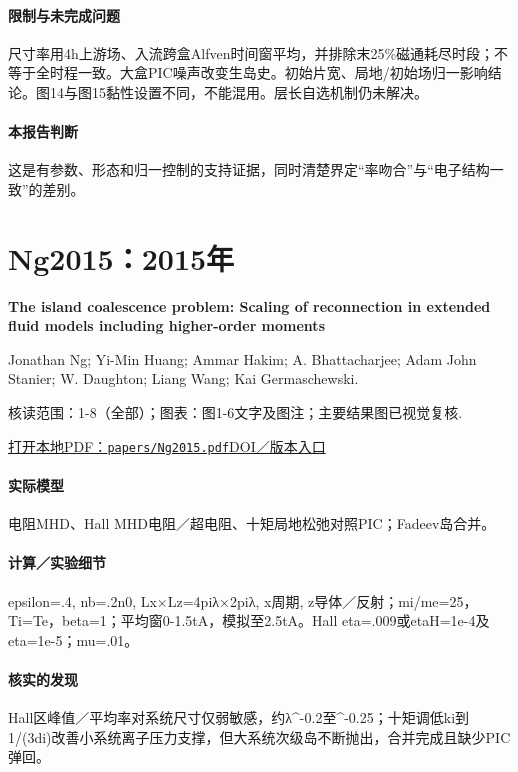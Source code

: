 \paragraph{限制与未完成问题}尺寸率用4h上游场、入流跨盒Alfven时间窗平均，并排除末25\%磁通耗尽时段；不等于全时程一致。大盒PIC噪声改变生岛史。初始片宽、局地/初始场归一影响结论。图14与图15黏性设置不同，不能混用。层长自选机制仍未解决。

\paragraph{本报告判断}这是有参数、形态和归一控制的支持证据，同时清楚界定“率吻合”与“电子结构一致”的差别。

\section{Ng2015：2015年}\label{paper:Ng2015}

\textbf{The island coalescence problem: Scaling of reconnection in extended fluid models including higher-order moments}\citep{Ng2015}\

Jonathan Ng;  Yi-Min Huang;  Ammar Hakim;  A. Bhattacharjee;  Adam  John Stanier;  W. Daughton;  Liang Wang;  Kai Germaschewski.

\textsf{核读范围：}1-8（全部）；\textsf{图表：}图1-6文字及图注；主要结果图已视觉复核.

\href{run:papers/Ng2015.pdf}{打开本地PDF：\texttt{papers/Ng2015.pdf}}\quad\href{https://doi.org/10.1063/1.4935302}{DOI／版本入口}

\paragraph{实际模型}电阻MHD、Hall MHD电阻／超电阻、十矩局地松弛对照PIC；Fadeev岛合并。

\paragraph{计算／实验细节}epsilon=.4, nb=.2n0, Lx×Lz=4piλ×2piλ, x周期, z导体／反射；mi/me=25，Ti=Te，beta=1；平均窗0-1.5tA，模拟至2.5tA。Hall eta=.009或etaH=1e-4及eta=1e-5；mu=.01。

\paragraph{核实的发现}Hall区峰值／平均率对系统尺寸仅弱敏感，约λ\textasciicircum{}-0.2至\textasciicircum{}-0.25；十矩调低ki到1/(3di)改善小系统离子压力支撑，但大系统次级岛不断抛出，合并完成且缺少PIC弹回。


